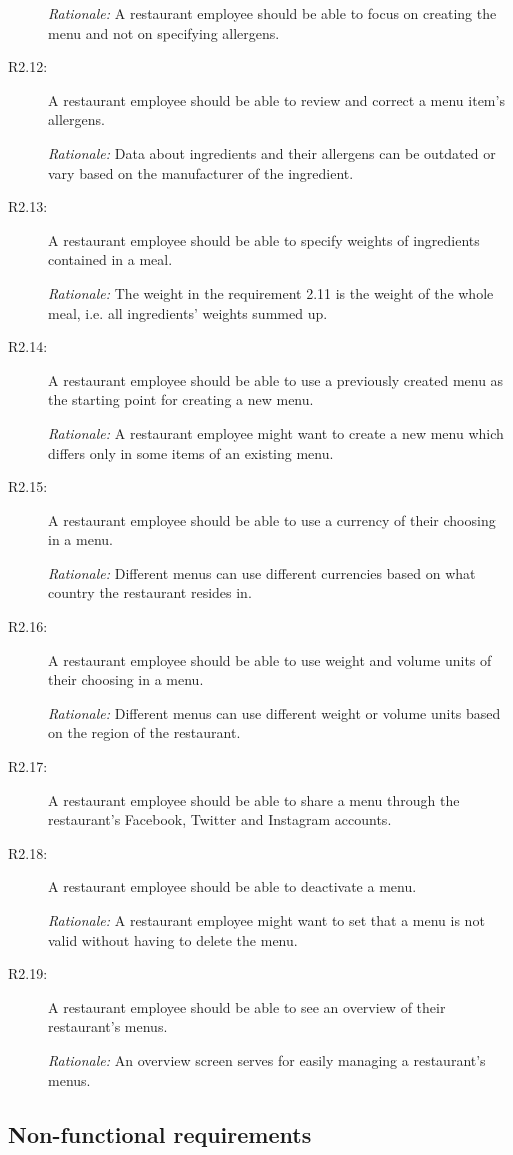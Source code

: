 \begin{description}
    \emph{Rationale:} A restaurant employee should be able to focus on creating the menu and not on specifying allergens.
    \item [R2.12:] A restaurant employee should be able to review and correct a menu item's allergens.

    \emph{Rationale:} Data about ingredients and their allergens can be outdated or vary based on the manufacturer of the ingredient.
    \item [R2.13:] A restaurant employee should be able to specify weights of ingredients contained in a meal.

    \emph{Rationale:} The weight in the requirement 2.11 is the weight of the whole meal, i.e. all ingredients' weights summed up.
    \item [R2.14:] A restaurant employee should be able to use a previously created menu as the starting point for creating a new menu.

    \emph{Rationale:} A restaurant employee might want to create a new menu which differs only in some items of an existing menu.
    \item [R2.15:] A restaurant employee should be able to use a currency of their choosing in a menu.

    \emph{Rationale:} Different menus can use different currencies based on what country the restaurant resides in.
    \item [R2.16:] A restaurant employee should be able to use weight and volume units of their choosing in a menu.

    \emph{Rationale:} Different menus can use different weight or volume units based on the region of the restaurant.
    \item [R2.17:] A restaurant employee should be able to share a menu through the restaurant's Facebook, Twitter and Instagram accounts.
    \item [R2.18:] A restaurant employee should be able to deactivate a menu.

    \emph{Rationale:} A restaurant employee might want to set that a menu is not valid without having to delete the menu.
    \item [R2.19:] A restaurant employee should be able to see an overview of their restaurant's menus.

    \emph{Rationale:} An overview screen serves for easily managing a restaurant's menus.
  \end{description}

\subsection{Non-functional requirements}


